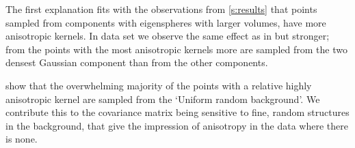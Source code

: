				The first explanation fits with the observations from \cref{s:results} that points sampled from components with eigenspheres with larger volumes, have more anisotropic kernels.
			In data set \baakmanThree we observe the same effect as in \ferdosiThree but stronger; from the points with the most anisotropic kernels more are sampled from the two densest Gaussian component than from the other components.

	 show that the overwhelming majority of the points with a relative highly anisotropic kernel are sampled from the `Uniform random background'. We contribute this to the covariance matrix being sensitive to fine, random structures in the background, that give the impression of anisotropy in the data where there is none.

